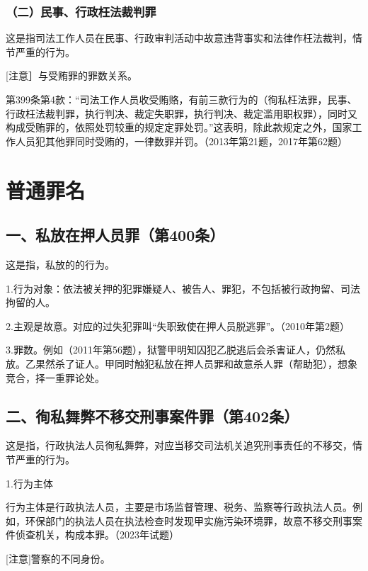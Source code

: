 \subsubsection*{（二）民事、行政枉法裁判罪}

这是指司法工作人员在民事、行政审判活动中故意违背事实和法律作枉法裁判，情节严重的行为。

[注意］与受贿罪的罪数关系。

第399条第4款：“司法工作人员收受贿赂，有前三款行为的（徇私枉法罪，民事、行政枉法裁判罪，执行判决、裁定失职罪，执行判决、裁定滥用职权罪），同时又构成受贿罪的，依照处罚较重的规定定罪处罚。”这表明，除此款规定之外，国家工作人员犯其他罪同时受贿的，一律数罪并罚。（2013年第21题，2017年第62题）

\section{普通罪名}

\subsection*{一、私放在押人员罪（第400条）}

这是指，私放的的行为。

1.行为对象：依法被关押的犯罪嫌疑人、被告人、罪犯，不包括被行政拘留、司法拘留的人。

2.主观是故意。对应的过失犯罪叫“失职致使在押人员脱逃罪”。（2010年第2题）

3.罪数。例如（2011年第56题），狱警甲明知囚犯乙脱逃后会杀害证人，仍然私放。乙果然杀了证人。甲同时触犯私放在押人员罪和故意杀人罪（帮助犯），想象竞合，择一重罪论处。

\subsection*{二、徇私舞弊不移交刑事案件罪（第402条）}

这是指，行政执法人员徇私舞弊，对应当移交司法机关追究刑事责任的不移交，情节严重的行为。

1.行为主体

行为主体是行政执法人员，主要是市场监督管理、税务、监察等行政执法人员。例如，环保部门的执法人员在执法检查时发现甲实施污染环境罪，故意不移交刑事案件侦查机关，构成本罪。（2023年试题）

[注意]警察的不同身份。


